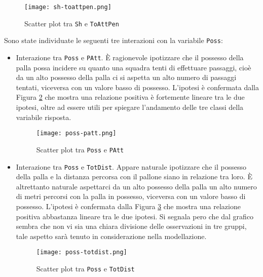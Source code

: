 \begin{itemize}
	\begin{figure}[htbp]
		\begin{center}
			\texttt{[image: sh-toattpen.png]}
			\caption{Scatter plot tra \texttt{Sh} e \texttt{ToAttPen}}  \label{fig:shpen}
		\end{center}
	\end{figure}
\end{itemize}

Sono state individuate le seguenti tre interazioni con la variabile \texttt{Poss}:
\begin{itemize}
	\item Interazione tra \texttt{Poss} e \texttt{PAtt}. È ragionevole ipotizzare che il possesso della palla possa incidere su quanto una squadra tenti di effettuare passaggi, cioè da un alto possesso della palla ci si aspetta un alto numero di passaggi tentati, viceversa con un valore basso di possesso. L'ipotesi è confermata dalla Figura \ref{fig:posspatt} che mostra una relazione positiva è fortemente lineare tra le due ipotesi, oltre ad essere utili per spiegare l'andamento delle tre classi della variabile risposta.
	\begin{figure}[htbp]
		\begin{center}
			\texttt{[image: poss-patt.png]}
			\caption{Scatter plot tra \texttt{Poss} e \texttt{PAtt}}  \label{fig:posspatt}
		\end{center}
	\end{figure}
	\item Interazione tra \texttt{Poss} e \texttt{TotDist}. Appare naturale ipotizzare che il possesso della palla e la distanza percorsa con il pallone siano in relazione tra loro. È altrettanto naturale aspettarci da un alto possesso della palla un alto numero di metri percorsi con la palla in possesso, viceversa con un valore basso di possesso. L'ipotesi è confermata dalla Figura \ref{fig:posstotdist} che mostra una relazione positiva abbastanza lineare tra le due ipotesi. Si segnala pero che dal grafico sembra che non vi sia una chiara divisione delle osservazioni in tre gruppi, tale aspetto sarà tenuto in considerazione nella modellazione.
	\begin{figure}[htbp]
		\begin{center}
			\texttt{[image: poss-totdist.png]}
			\caption{Scatter plot tra \texttt{Poss} e \texttt{TotDist}}  \label{fig:posstotdist}
		\end{center}
	\end{figure}
\end{itemize}
